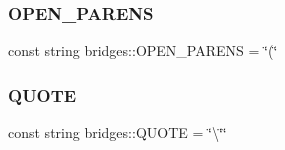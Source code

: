 \subsubsection{\texorpdfstring{O\+P\+E\+N\+\_\+\+P\+A\+R\+E\+NS}{OPEN\_PARENS}}
{\footnotesize\ttfamily const string bridges\+::\+O\+P\+E\+N\+\_\+\+P\+A\+R\+E\+NS = \char`\"{}(\char`\"{}}

\mbox{\label{namespacebridges_acd8357e88562cbb7e60bea3fac422ac3}} 
\subsubsection{\texorpdfstring{Q\+U\+O\+TE}{QUOTE}}
{\footnotesize\ttfamily const string bridges\+::\+Q\+U\+O\+TE = \char`\"{}\textbackslash{}\char`\"{}\char`\"{}}

